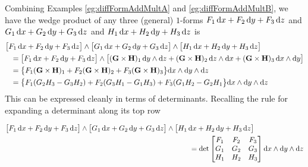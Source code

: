 \begin{eg}\label{eg:diffFormAddMultC}
Combining Examples \ref{eg:diffFormAddMultA} and \ref{eg:diffFormAddMultB}, 
we have the wedge product of any three (general)
$1$-forms
    $F_1\,\mathrm{d}x
     + F_2\,\mathrm{d}y
     + F_3\,\mathrm{d}z$
and
    $G_1\,\mathrm{d}x
     + G_2\,\mathrm{d}y
     + G_3\,\mathrm{d}z$
and 
    $H_1\,\mathrm{d}x
     + H_2\,\mathrm{d}y
     + H_3\,\mathrm{d}z$
is
\begin{align*}
&\big[F_1\,\mathrm{d}x
     + F_2\,\mathrm{d}y
     + F_3\,\mathrm{d}z\big]
   \wedge
   \big[G_1\,\mathrm{d}x
     + G_2\,\mathrm{d}y
     + G_3\,\mathrm{d}z\big]
   \wedge
   \big[H_1\,\mathrm{d}x
     + H_2\,\mathrm{d}y
     + H_3\,\mathrm{d}z\big]
\\
&\hskip0.1in=\big[F_1\,\mathrm{d}x
     + F_2\,\mathrm{d}y
     + F_3\,\mathrm{d}z\big]
   \wedge
   \big[(\mathbf{G}\times\mathbf{H})_1\, \mathrm{d}y\wedge\mathrm{d}z
 +(\mathbf{G}\times\mathbf{H})_2\, \mathrm{d}z\wedge\mathrm{d}x
 +(\mathbf{G}\times\mathbf{H})_3\, \mathrm{d}x\wedge\mathrm{d}y\big]
\\
&\hskip0.1in
  =\big\{F_1(\mathbf{G}\times\mathbf{H})_1 + F_2(\mathbf{G}\times\mathbf{H})_2 + F_3(\mathbf{G}\times\mathbf{H})_3\big\}
     \mathrm{d}x\wedge\mathrm{d}y\wedge\mathrm{d}z
\\
&\hskip0.1in
  =\big\{F_1(G_2H_3-G_3H_2) + 
         F_2(G_3H_1-G_1H_3) + 
         F_3(G_1H_2-G_2H_1\big\}
     \mathrm{d}x\wedge\mathrm{d}y\wedge\mathrm{d}z
\end{align*}
This can be expressed cleanly in terms of determinants.
Recalling the rule for expanding a determinant along its top row
\begin{impeqn}\label{eqnProd3Form}
\begin{align*}
&\big[F_1\,\dee{x}
     + F_2\,\dee{y}
     + F_3\,\dee{z}\big]
   \wedge
   \big[G_1\,\dee{x}
     + G_2\,\dee{y}
     + G_3\,\dee{z}\big]
   \wedge
   \big[H_1\,\dee{x}
     + H_2\,\dee{y}
     + H_3\,\dee{z}\big]
\\
&\hskip3.5in
  =\det\left[\begin{matrix} F_1 & F_2 & F_3 \\ 
                            G_1 & G_2 & G_3 \\
                            H_1 & H_2 & H_3 \end{matrix}\right]
     \dee{x}\wedge\dee{y}\wedge\dee{z}
\end{align*}
\end{impeqn}
\end{eg}

